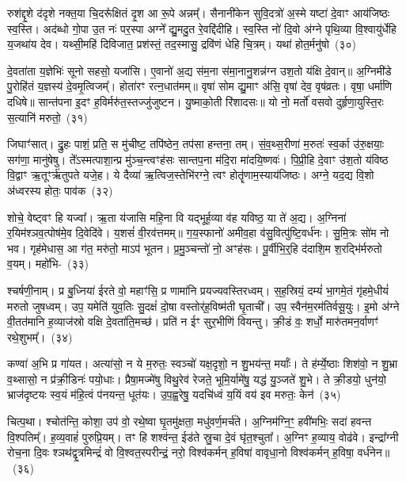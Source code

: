 रुश॑द्दृ॒शे द॑दृशे नक्त॒या चि॒दरू᳚क्षितं दृ॒श आ रू॒पे अन्नम्᳚। सैनानी॑केन सुवि॒दत्रो॑ अ॒स्मे यष्टा॑ दे॒वाꣳ आय॑जिष्ठः स्व॒स्ति। अद॑ब्धो गो॒पा उ॒त नः॑ पर॒स्पा अग्ने᳚ द्यु॒मदु॒त रे॒वद्दि॑दीहि। स्व॒स्ति नो॑ दि॒वो अ॑ग्ने पृथि॒व्या वि॒श्वायु॑र्धेहि य॒जथा॑य देव। यथ्सी॒महि॑ दिविजात॒ प्रश॑स्तं॒ तद॒स्मासु॒ द्रवि॑णं धेहि चि॒त्रम्। यथा॑ होत॒र्मनु॑षो~(३०)\ip

दे॒वता॑ता य॒ज्ञेभिः॑ सूनो सहसो॒ यजा॑सि। ए॒वानो॑ अ॒द्य स॑म॒ना स॑मा॒नानु॒शन्न॑ग्न उश॒तो य॑क्षि दे॒वान्॥ अ॒ग्निमी॑डे पु॒रोहि॑तं य॒ज्ञस्य॑ दे॒वमृ॒त्विजम्᳚। होता॑रꣳ रत्न॒धात॑मम्॥ वृषा॑ सोम द्यु॒माꣳ अ॑सि॒ वृषा॑ देव॒ वृष॑व्रतः। वृषा॒ धर्मा॑णि दधिषे॥ सान्त॑पना इ॒दꣳ ह॒विर्मरु॑त॒स्तज्जु॑जुष्टन। यु॒ष्माको॒ती रि॑शादसः॥ यो नो॒ मर्तो॑ वसवो दुर्\mbox{}हृणा॒युस्ति॒रः स॒त्यानि॑ मरुतो॒~(३१)\ip

जिघाꣳ॑सात्। द्रु॒हः पाशं॒ प्रति॒ स मु॑चीष्ट॒ तपि॑ष्ठेन॒ तप॑सा हन्तना॒ तम्। सं॒व॒थ्स॒रीणा॑ म॒रुतः॑ स्व॒र्का उ॑रु॒क्षयाः॒ सग॑णा॒ मानु॑षेषु। ते᳚\-ऽस्मत्पाशा॒न्प्र मु॑ञ्च॒न्त्वꣳह॑सः सान्तप॒ना म॑दि॒रा मा॑दयि॒ष्णवः॑। पि॒प्री॒हि दे॒वाꣳ उ॑श॒तो य॑विष्ठ वि॒द्वाꣳ ऋ॒तूꣳर्\mbox{}ऋ॑तुपते यजे॒ह। ये दैव्या॑ ऋ॒त्विज॒स्तेभि॑रग्ने॒ त्वꣳ होतॄ॑णाम॒स्याय॑जिष्ठः। अग्ने॒ यद॒द्य वि॒शो अ॑ध्वरस्य होतः॒ पाव॑क~(३२)\ip

शोचे॒ वेष्ट्वꣳ हि यज्वा᳚। ऋ॒ता य॑जासि महि॒ना वि यद्भूर्\mbox{}ह॒व्या व॑ह यविष्ठ॒ या ते॑ अ॒द्य। अ॒ग्निना॑ र॒यिम॑श्ञव॒त्पोष॑मे॒व दि॒वेदि॑वे। य॒शसं॑ वी॒रव॑त्तमम्॥ ग॒य॒स्फानो॑ अमीव॒हा व॑सु॒वित्पु॑ष्टि॒वर्ध॑नः। सु॒मि॒त्रः सो॑म नो भव। गृह॑मेधास॒ आ ग॑त॒ मरु॑तो॒ माऽप॑ भूतन। प्र॒मु॒ञ्चन्तो॑ नो॒ अꣳह॑सः। पू॒र्वीभि॒र्॒\mbox{}हि द॑दाशि॒म श॒रद्भि॑र्मरुतो व॒यम्। महो॑भि-~(३३)\ip

श्चर्\mbox{}षणी॒नाम्। प्र बु॒ध्निया॑ ईरते वो॒ महाꣳ॑सि॒ प्र णामा॑नि प्रयज्यवस्तिरध्वम्। स॒ह॒स्रियं॒ दम्यं॑ भा॒गमे॒तं गृ॑हमे॒धीयं॑ मरुतो जुषध्वम्। उप॒ यमेति॑ युव॒तिः सु॒दक्षं॑ दो॒षा वस्तोर्॑\mbox{}ह॒विष्म॑ती घृ॒ताची᳚। उप॒ स्वैन॑म॒रम॑तिर्वसू॒युः। इ॒मो अ॑ग्ने वी॒तत॑मानि ह॒व्याज॑स्रो वक्षि दे॒वता॑ति॒मच्छ॑। प्रति॑ न ईꣳ सुर॒भीणि॑ वियन्तु। क्री॒डं वः॒ शर्धो॒ मारु॑तमन॒र्वाणꣳ॑ रथे॒शुभम्᳚।~(३४)\ip

कण्वा॑ अ॒भि प्र गा॑यत। अत्या॑सो॒ न ये म॒रुतः॒ स्वञ्चो॑ यक्ष॒दृशो॒ न शु॒भय॑न्त॒ मर्याः᳚। ते ह॑र्म्ये॒ष्ठाः शिश॑वो॒ न शु॒भ्रा व॒थ्सासो॒ न प्र॑क्री॒डिनः॑ पयो॒धाः। प्रैषा॒मज्मे॑षु विथु॒रेव॑ रेजते॒ भूमि॒र्यामे॑षु॒ यद्ध॑ यु॒ञ्जते॑ शु॒भे। ते क्री॒डयो॒ धुन॑यो॒ भ्राज॑दृष्टयः स्व॒यं म॑हि॒त्वं प॑नयन्त॒ धूत॑यः। उ॒प॒ह्व॒रेषु॒ यदचि॑ध्वं य॒यिं वय॑ इव मरुतः॒ केन॑~(३५)\ip

चित्प॒था। श्चोत॑न्ति॒ कोशा॒ उप॑ वो॒ रथे॒ष्वा घृ॒तमु॑क्षता॒ मधु॑वर्ण॒मर्च॑ते। अ॒ग्निम॑ग्नि॒ꣳ॒ हवी॑मभिः॒ सदा॑ हवन्त वि॒श्पतिम्᳚। ह॒व्य॒वाहं॑ पुरुप्रि॒यम्। तꣳ हि शश्व॑न्त॒ ईड॑ते स्रु॒चा दे॒वं घृ॑त॒श्चुता᳚। अ॒ग्निꣳ ह॒व्याय॒ वोढ॑वे। इन्द्रा᳚ग्नी रोच॒ना दि॒वः श्ञथ॑द्वृ॒त्रमिन्द्रं॑ वो वि॒श्वत॒स्परीन्द्रं॒ नरो॒ विश्व॑कर्मन् ह॒विषा॑ वावृधा॒नो विश्व॑कर्मन् ह॒विषा॒ वर्ध॑नेन॥~(३६)\ip

